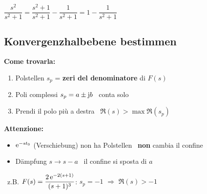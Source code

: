 \vspace{1.2em}

\vspace{0.4em}
$\dfrac{s^2}{s^2+1} = \dfrac{s^2+1}{s^2+1} - \dfrac{1}{s^2+1} = 1 - \dfrac{1}{s^2+1}$



\subsection{Konvergenzhalbebene bestimmen}\label{anh:konvergenz} 
\textbf{Come trovarla:}
\begin{enumerate}
    \item Polstellen $s_p$ = \textbf{zeri del denominatore} di $F(s)$
    \item Poli complessi $s_p = a \pm \mathrm{j} b$ \textrightarrow\ conta solo 
    \item Prendi il polo più a destra \textrightarrow\ $\Re(s) > \max \Re(s_p)$
\end{enumerate}

\textbf{Attenzione:}
\begin{itemize}
    \item $\mathrm{e}^{-s t_0}$ (Verschiebung) non ha Polstellen \textrightarrow\ \textbf{non} cambia il confine
    \item Dämpfung $s \to s-a$ \textrightarrow\ il confine si sposta di $a$
\end{itemize}

\textrightarrow\ z.B. $F(s) = \dfrac{2\,\mathrm{e}^{-2(s+1)}}{(s+1)^3}$: $s_p = -1$ \quad $\Rightarrow$ \quad $\Re(s) > -1$

